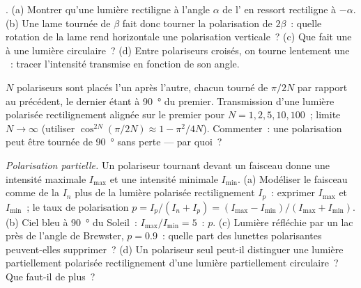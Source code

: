 \begin{exercise}[$\star\star$]\label{exo:b2:plane-waves-polarization:7}
. (a) Montrer qu'une lumière rectiligne à l'angle $\alpha$ de
l' en ressort rectiligne à $-\alpha$. (b) Une lame tournée de $\beta$
fait donc tourner la polarisation de $2\beta$~: quelle rotation de la lame rend
horizontale une polarisation verticale~? (c) Que fait une  à une
lumière circulaire~? (d) Entre polariseurs croisés, on tourne lentement une ~:
tracer l'intensité transmise en fonction de son angle.
\end{exercise}

\begin{exercise}[$\star\star$]\label{exo:b2:plane-waves-polarization:8}
$N$ polariseurs sont placés l'un après l'autre, chacun tourné de
$\pi/2N$ par rapport au précédent, le dernier étant à \qty{90}{\degree} du
premier. Transmission d'une lumière polarisée rectilignement alignée sur le premier
pour $N = 1, 2, 5, 10, 100$~; limite $N \to \infty$ (utiliser $\cos^{2N}(\pi/2N) \approx
1 - \pi^2/4N$). Commenter~: une polarisation peut être tournée de \qty{90}{\degree}
sans perte --- par quoi~?
\end{exercise}

\begin{exercise}[$\star\star$]\label{exo:b2:plane-waves-polarization:9}
\emph{Polarisation partielle.} Un polariseur tournant devant un faisceau
donne une intensité maximale $I_{\max}$ et une intensité minimale $I_{\min}$. (a) Modéliser le
faisceau comme de la  $I_n$ plus de la lumière polarisée rectilignement $I_p$~: exprimer
$I_{\max}$ et $I_{\min}$~; le taux de polarisation $p = I_p/(I_n + I_p) =
(I_{\max} - I_{\min})/(I_{\max} + I_{\min})$. (b) Ciel bleu à \qty{90}{\degree} du
Soleil~: $I_{\max}/I_{\min} = 5$~: $p$. (c) Lumière réfléchie par un lac près de
l'angle de Brewster, $p = 0.9$~: quelle part des lunettes polarisantes peuvent-elles supprimer~?
(d) Un polariseur seul peut-il distinguer une lumière partiellement polarisée
rectilignement d'une lumière partiellement circulaire~? Que faut-il de plus~?
\end{exercise}

